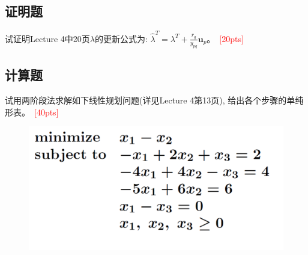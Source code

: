 \documentclass[10pt]{article}
\begin{document}
\subsection{证明题}
试证明Lecture 4中20页$\lambda$的更新公式为: $\hat{\lambda}^T = \lambda^T + \frac{r_q}{y_{pq}} \bm{u}_p$。~\textcolor{red}{[20pts]}

\subsection{计算题}
试用两阶段法求解如下线性规划问题(详见Lecture 4第13页), 给出各个步骤的单纯形表。~\textcolor{red}{[40pts]}
\begin{figure}[H]
	\centering
	\includegraphics[width=0.4\linewidth]{hw3_3.png}
	\label{fig.prob3}
\end{figure}
\end{document}
